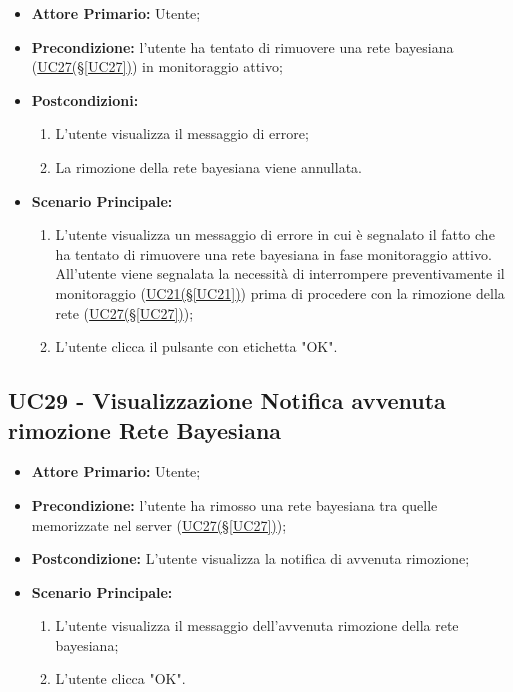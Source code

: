 \begin{itemize}
	\item \textbf{Attore Primario:} Utente;
	\item \textbf{Precondizione:} l'utente ha tentato di rimuovere una rete bayesiana (\hyperref[UC27]{UC27(§\ref*{UC27})}) in monitoraggio attivo;
	\item \textbf{Postcondizioni:}
	\begin{enumerate}
		\item L'utente visualizza il messaggio di errore;
		\item La rimozione della rete bayesiana viene annullata.
	\end{enumerate}
	\item \textbf{Scenario Principale:}
	\begin{enumerate}
		\item L'utente visualizza un messaggio di errore in cui è segnalato il fatto che ha tentato di rimuovere una rete bayesiana in fase monitoraggio attivo. All'utente viene segnalata la necessità di interrompere preventivamente il monitoraggio (\hyperref[UC21]{UC21(§\ref*{UC21})}) prima di procedere con la rimozione della rete (\hyperref[UC27]{UC27(§\ref*{UC27})});
		\item L'utente clicca il pulsante con etichetta "OK".
	\end{enumerate}
\end{itemize}

\pagebreak

\subsection{UC29 - Visualizzazione Notifica avvenuta rimozione Rete Bayesiana}\label{UC29}

\begin{itemize}
	\item \textbf{Attore Primario:} Utente;
	\item \textbf{Precondizione:} l'utente ha rimosso una rete bayesiana tra quelle memorizzate nel server (\hyperref[UC27]{UC27(§\ref*{UC27})});
	\item \textbf{Postcondizione:} L'utente visualizza la notifica di avvenuta rimozione;
	\item \textbf{Scenario Principale:}
	\begin{enumerate}
		\item L'utente visualizza il messaggio dell'avvenuta rimozione della rete bayesiana;
		\item L'utente clicca "OK".
	\end{enumerate}
\end{itemize}

